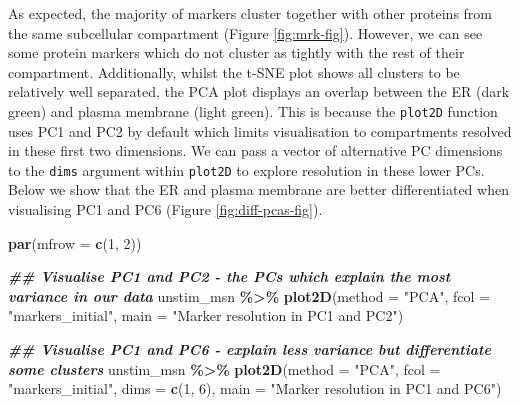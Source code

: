 \documentclass[9pt,a4paper,]{extarticle}
\newenvironment{Shaded}{\begin{snugshade}}{\end{snugshade}}
\newcommand{\AttributeTok}[1]{\textcolor[rgb]{0.13,0.29,0.53}{#1}}
\newcommand{\DecValTok}[1]{\textcolor[rgb]{0.00,0.00,0.81}{#1}}
\newcommand{\DocumentationTok}[1]{\textcolor[rgb]{0.56,0.35,0.01}{\textbf{\textit{#1}}}}
\newcommand{\FunctionTok}[1]{\textcolor[rgb]{0.13,0.29,0.53}{\textbf{#1}}}
\newcommand{\NormalTok}[1]{#1}
\newcommand{\SpecialCharTok}[1]{\textcolor[rgb]{0.81,0.36,0.00}{\textbf{#1}}}
\newcommand{\StringTok}[1]{\textcolor[rgb]{0.31,0.60,0.02}{#1}}
\begin{document}
As expected, the majority of markers cluster together with other proteins from
the same subcellular compartment (Figure \ref{fig:mrk-fig}). However, we can
see some protein markers which do not cluster as tightly with the rest of their
compartment. Additionally, whilst the t-SNE plot shows all clusters to be
relatively well separated, the PCA plot displays an overlap between the ER (dark
green) and plasma membrane (light green). This is because the \texttt{plot2D} function
uses PC1 and PC2 by default which limits visualisation to compartments resolved
in these first two dimensions. We can pass a vector of alternative PC dimensions
to the \texttt{dims} argument within \texttt{plot2D} to explore resolution in these lower PCs.
Below we show that the ER and plasma membrane are better differentiated when
visualising PC1 and PC6 (Figure \ref{fig:diff-pcas-fig}).

\begin{Shaded}
\begin{Highlighting}[]
\FunctionTok{par}\NormalTok{(}\AttributeTok{mfrow =} \FunctionTok{c}\NormalTok{(}\DecValTok{1}\NormalTok{, }\DecValTok{2}\NormalTok{))}

\DocumentationTok{\#\# Visualise PC1 and PC2 {-} the PCs which explain the most variance in our data}
\NormalTok{unstim\_msn }\SpecialCharTok{\%\textgreater{}\%}
\FunctionTok{plot2D}\NormalTok{(}\AttributeTok{method =} \StringTok{"PCA"}\NormalTok{, }\AttributeTok{fcol =} \StringTok{"markers\_initial"}\NormalTok{,}
       \AttributeTok{main =} \StringTok{"Marker resolution in PC1 and PC2"}\NormalTok{)}

\DocumentationTok{\#\# Visualise PC1 and PC6 {-} explain less variance but differentiate some clusters}
\NormalTok{unstim\_msn }\SpecialCharTok{\%\textgreater{}\%}
\FunctionTok{plot2D}\NormalTok{(}\AttributeTok{method =} \StringTok{"PCA"}\NormalTok{, }\AttributeTok{fcol =} \StringTok{"markers\_initial"}\NormalTok{,}
       \AttributeTok{dims =} \FunctionTok{c}\NormalTok{(}\DecValTok{1}\NormalTok{, }\DecValTok{6}\NormalTok{), }\AttributeTok{main =} \StringTok{"Marker resolution in PC1 and PC6"}\NormalTok{)}
\end{Highlighting}
\end{Shaded}
\end{document}

